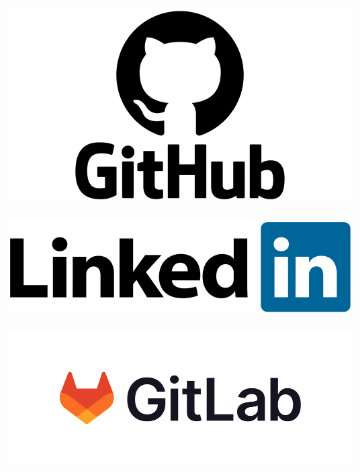 \documentclass[12pt,a4paper]{article}
\begin{document}
    \begin{figure}[b]
        \centering
        \begin{subfigure}[b]{0.15\linewidth}
            \href{https://github.com/icharo-tb}{\includegraphics[width=\linewidth]{Images/GitHub-logo.png}}
        \end{subfigure}
        \begin{subfigure}[b]{0.15\linewidth}
            \href{https://www.linkedin.com/in/danielopezpajares/}{\includegraphics[width=\linewidth]{Images/LinkedIn_Logo.png}}
        \end{subfigure}
        \begin{subfigure}[b]{0.15\linewidth}
            \href{https://gitlab.com/daniel.lopez.pajares.2021}{\includegraphics[width=\linewidth]{Images/GitLab_logo.png}}
        \end{subfigure}
    \end{figure}
\end{document}
